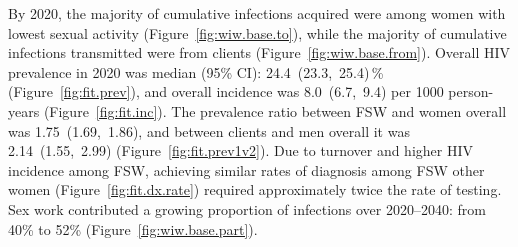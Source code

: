 By 2020, the majority of cumulative infections acquired
were among women with lowest sexual activity (Figure~\ref{fig:wiw.base.to}),
while the majority of cumulative infections transmitted
were from clients (Figure~\ref{fig:wiw.base.from}).
Overall HIV prevalence in 2020 was median (95\% CI):
24.4~(23.3,~25.4)\,\% (Figure~\ref{fig:fit.prev}), %
and overall incidence was 8.0~(6.7,~9.4) per 1000 person-years (Figure~\ref{fig:fit.inc}).
The prevalence ratio between FSW and women overall was 1.75~(1.69,~1.86), %
and between clients and men overall it was 2.14~(1.55,~2.99) %
(Figure~\ref{fig:fit.prev1v2}).
Due to turnover and higher HIV incidence among FSW,
achieving similar rates of diagnosis among FSW \vs other women (Figure~\ref{fig:fit.dx.rate})
required approximately twice the rate of testing. %
Sex work contributed a growing proportion of infections
over 2020--2040: from 40\% to 52\% (Figure~\ref{fig:wiw.base.part}). %
